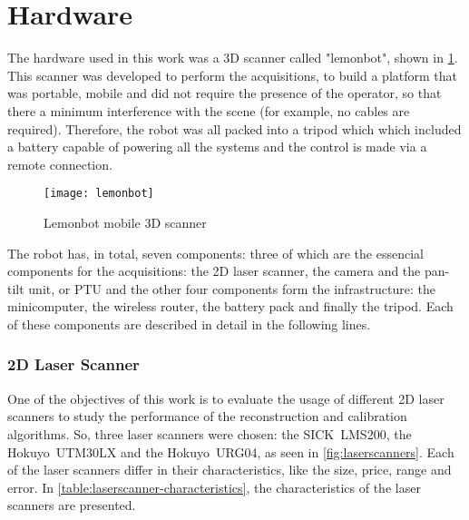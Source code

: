 \section{Hardware}
\label{section:hardware}

The hardware used in this work was a 3D scanner called "lemonbot", shown in \cref{fig:lemonbot}. This scanner was developed to perform the acquisitions, to build a platform that was portable, mobile and did not require the presence of the operator, so that there a minimum interference with the scene (for example, no cables are required). Therefore, the robot was all packed into a tripod which which included a battery capable of powering all the systems and the control is made via a remote connection.

\begin{figure}[p]
    
    \centering
    \texttt{[image: lemonbot]}

    \caption{Lemonbot mobile 3D scanner}
    \label{fig:lemonbot}
\end{figure}

The robot has, in total, seven components: three of which are the essencial components for the acquisitions: the 2D laser scanner, the camera and the pan-tilt unit, or PTU and the other four components form the infrastructure: the minicomputer, the wireless router, the battery pack and finally the tripod. Each of these components are described in detail in the following lines.

\subsubsection{2D Laser Scanner}

One of the objectives of this work is to evaluate the usage of different 2D laser scanners to study the performance of the reconstruction and calibration algorithms. So, three laser scanners were chosen: the SICK~LMS200, the Hokuyo~UTM30LX and the Hokuyo~URG04, as seen in \cref{fig:laserscanners}. Each of the laser scanners differ in their characteristics, like the size, price, range and error. In \cref{table:laserscanner-characteristics}, the characteristics of the laser scanners are presented.

